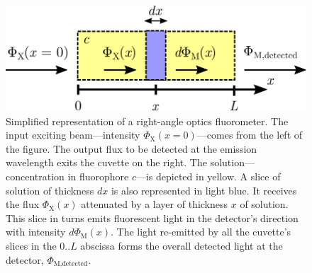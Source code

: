 \begin{figure}
	\centering
	\includegraphics[scale=0.7]{2_appendices/figures/right_angle_scheme.pdf}
	\caption[Right-angle optics scheme.]{Simplified representation of a right-angle optics fluorometer. The input exciting beam---intensity $\Phi_\text{X}(x=0)$---comes from the left of the figure. The output flux to be detected at the emission wavelength exits the cuvette on the right. The solution---concentration in fluorophore $c$---is depicted in yellow. A slice of solution of thickness $dx$ is also represented in light blue. It receives the flux $\Phi_\text{X}(x)$ attenuated by a layer of thickness $x$ of solution. This slice in turns emits fluorescent light in the detector's direction with intensity $d\Phi_\text{M}(x)$. The  light re-emitted by all the cuvette's slices in the 0..$L$ abscissa forms the overall detected light at the detector, $\Phi_\text{M,detected}$.}
	\label{annfig:fluo_quenching:fluo_right_spectro}
\end{figure}

